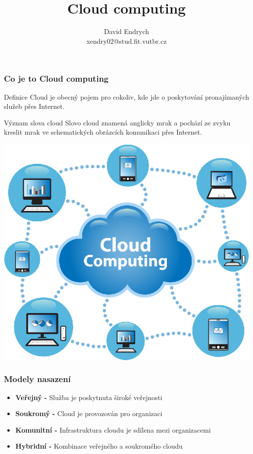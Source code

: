 \documentclass{beamer}
\title[Cloud computing] {Cloud computing}
\author[Autor: David Endrych] {David Endrych \\
 xendry02@stud.fit.vutbr.cz}
\institute[VUT BRNO] 
{
  Vysoké učení technické v Brně \\
  Fakulta informačních technologií
}
\date[ITY 2017] 
{}
\begin{document}
\frame{\titlepage}

\begin{frame}
    \frametitle{Co je to Cloud computing}
	\begin{block}{Definice}
	Cloud je obecný pojem pro cokoliv, kde jde o poskytování pronajímaných služeb přes Internet. 
	\end{block}
	\begin{block}{Význam slova cloud}
	Slovo cloud znamená anglicky mrak a pochází ze zvyku kreslit mrak ve schematických obrázcích komunikaci přes Internet.
	\end{block}
\end{frame}
\begin{frame}
\begin{center}
  \includegraphics[scale=1]{scheme.eps}
\end{center}
\end{frame}
\begin{frame}
    \frametitle{Modely nasazení}
    \begin{itemize}
	\item \textbf{Veřejný -} Služba je poskytnuta široké veřejnosti 
	\item \textbf{Soukromý -} Cloud je provozován pro organizaci
	\item \textbf{Komunitní -} Infrastruktura cloudu je sdílena mezi organizacemi
	\item \textbf{Hybridní -} Kombinace veřejného a soukromého cloudu       
    \end{itemize}
\end{frame}
\end{document}
